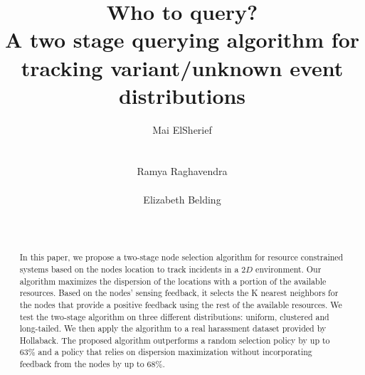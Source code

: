 \documentclass{acm_proc_article-sp}
\begin{document}
\title{Who to query? \\A two stage querying algorithm for tracking variant/unknown event distributions }
\author{
%
%
\alignauthor
Mai ElSherief\\
  \\
  \\
  \alignauthor
Ramya Raghavendra\\
  \\
\alignauthor
Elizabeth Belding\\
 \\
  \\
}
\maketitle
\begin{abstract}
In this paper, we propose a two-stage node selection algorithm for resource constrained systems based on the nodes location to track incidents in a $2D$ environment. Our algorithm maximizes the dispersion of the locations with a portion of the available resources. Based on the nodes' sensing feedback, it selects the K nearest neighbors for the nodes that provide a positive feedback using the rest of the available resources. We test the two-stage algorithm on three different distributions: uniform, clustered and long-tailed. We then apply the algorithm to a real harassment dataset provided by Hollaback. The proposed algorithm outperforms a random selection policy by up to $63\%$ and a policy that relies on dispersion maximization without incorporating feedback from the nodes by up to $68\%$.
\end{abstract}
\end{document}
